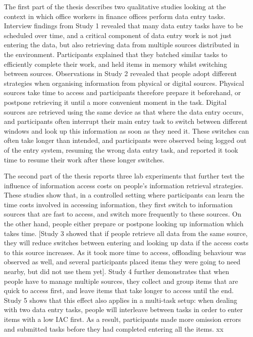 The first part of the thesis describes two qualitative studies looking at the context in which office workers in finance offices perform data entry tasks. Interview findings from Study 1 revealed that many data entry tasks have to be scheduled over time, and a critical component of data entry work is not just entering the data, but also retrieving data from multiple sources distributed in the environment. Participants explained that they batched similar tasks to efficiently complete their work, and held items in memory whilst switching between sources. Observations in Study 2 revealed that people adopt different strategies when organising information from physical or digital sources. Physical sources take time to access and participants therefore prepare it beforehand, or postpone retrieving it until a more convenient moment in the task. Digital sources are retrieved using the same device as that where the data entry occurs, and participants often interrupt their main entry task to switch between different windows and look up this information as soon as they need it. These switches can often take longer than intended, and participants were observed being logged out of the entry system, resuming the wrong data entry task, and reported it took time to resume their work after these longer switches.


The second part of the thesis reports three lab experiments that further test the influence of information access costs on people's information retrieval strategies. These studies show that, in a controlled setting where participants can learn the time costs involved in accessing information, they first switch to information sources that are fast to access, and switch more frequently to these sources. On the other hand, people either prepare or postpone looking up information which takes time. [Study 3 showed that if people retrieve all data from the same source, they will reduce switches between entering and looking up data if the access costs to this source increases. As it took more time to access, offloading behaviour was observed as well, and several participants placed items they were going to need nearby, but did not use them yet]. Study 4 further demonstrates that when people have to manage multiple sources, they collect and group items that are quick to access first, and leave items that take longer to access until the end. Study 5 shows that this effect also applies in a multi-task setup: when dealing with two data entry tasks, people will interleave between tasks in order to enter items with a low IAC first. As a result, participants made more omission errors and submitted tasks before they had completed entering all the items.  xx

